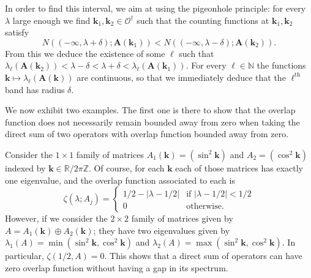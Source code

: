 \documentclass[10pt]{amsart}
\theoremstyle{definition}\newtheorem{defi}[theo]{Definition}\newtheorem{rema}[theo]{Remark}\newtheorem{exam}[theo]{Example}\newtheorem{nota}[theo]{Notation}
\newcommand{\R}{\mathbb R}
\newcommand{\N}{\mathbb N}
\newcommand{\Z}{\mathbb Z}
\newcommand{\CO}{\mathcal{O}}
\newcommand{\BA}{\mathbf A}
\newcommand{\bk}{\mathbf k}
\newcommand{\abs}[1]{\left\lvert #1 \right\rvert}
\begin{document}
In order to find this interval, we aim at using the pigeonhole principle: for every $\lambda$ large enough we find $\bk_1, \bk_2 \in \CO^\dagger$ such that the counting functions at $\bk_1,\bk_2$ satisfy
\begin{equation}\label{eq:characoverlap}
N((-\infty,\lambda + \delta);\BA(\bk_1)) < N((-\infty,\lambda - \delta);\BA(\bk_2)).
\end{equation}
From this we deduce the existence of some $\ell$ such that $\lambda_\ell(\BA(\bk_2)) < \lambda - \delta < \lambda + \delta <\lambda_\ell(\BA(\bk_1))$. For every $\ell \in \N$ the functions $\bk \mapsto
\lambda_\ell(\BA(\bk))$ are continuous, so that we immediately deduce that the $\ell^{\text{th}}$ band has radius $\delta$.

We now exhibit two examples. The first one is there to show that the overlap function does not necessarily remain bounded away from zero when taking the direct sum of two operators with overlap function bounded away from zero.
\begin{exem}\label{ex:overlapcrash}
Consider the $1 \times 1$ family of matrices $A_1(\bk) = (\sin^2 \bk)$ and $A_2 = (\cos^2 \bk)$ indexed by $\bk \in \R/2\pi\Z$. Of course, for each $\bk$ each of those matrices has exactly one eigenvalue, and the overlap function associated to each is
\begin{equation}
\zeta(\lambda;A_j) =
\begin{cases}
1/2 - \abs{\lambda - 1/2}& \text{if } \abs{\lambda - 1/2} < 1/2 \\
0 & \text{otherwise.}
\end{cases}
\end{equation}
However, if we consider the $2 \times 2$ family of matrices given by $A = A_1(\bk)
\oplus A_2(\bk)$; they have two eigenvalues given by $\lambda_1(A) =
\min(\sin^2\bk,\cos^2 \bk)$ and $\lambda_2(A) =
\max(\sin^2 \bk,\cos^2 \bk)$. In particular, $\zeta(1/2,A) = 0$. This shows that a direct sum of operators can have zero overlap function without having a gap in its spectrum.
\end{exem}
\end{document}
